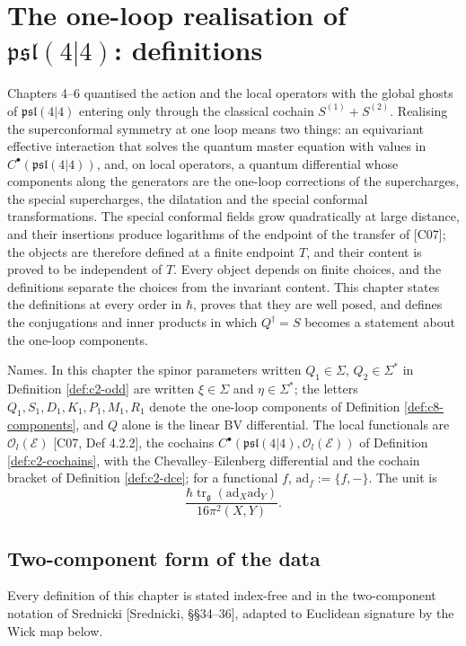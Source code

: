 \chapter{The one-loop realisation of $\mathfrak{psl}(4|4)$: definitions}

Chapters 4--6 quantised the action and the local operators with the global ghosts of $\mathfrak{psl}(4|4)$ entering only through the classical cochain $S^{(1)}+S^{(2)}$. Realising the superconformal symmetry at one loop means two things: an equivariant effective interaction that solves the quantum master equation with values in $C^\bullet(\mathfrak{psl}(4|4))$, and, on local operators, a quantum differential whose components along the generators are the one-loop corrections of the supercharges, the special supercharges, the dilatation and the special conformal transformations. The special conformal fields grow quadratically at large distance, and their insertions produce logarithms of the endpoint of the transfer of [C07]; the objects are therefore defined at a finite endpoint $T$, and their content is proved to be independent of $T$. Every object depends on finite choices, and the definitions separate the choices from the invariant content. This chapter states the definitions at every order in $\hbar$, proves that they are well posed, and defines the conjugations and inner products in which $Q^\dagger=S$ becomes a statement about the one-loop components.

Names. In this chapter the spinor parameters written $Q_1\in\Sigma$, $Q_2\in\Sigma^*$ in Definition \ref{def:c2-odd} are written $\xi\in\Sigma$ and $\eta\in\Sigma^*$; the letters $Q_1,S_1,D_1,K_1,P_1,M_1,R_1$ denote the one-loop components of Definition \ref{def:c8-components}, and $Q$ alone is the linear BV differential. The local functionals are $\mathscr O_l(\mathscr E)$ [C07, Def 4.2.2], the cochains $C^\bullet(\mathfrak{psl}(4|4),\mathscr O_l(\mathscr E))$ of Definition \ref{def:c2-cochains}, with the Chevalley--Eilenberg differential and the cochain bracket of Definition \ref{def:c2-dce}; for a functional $f$, $\mathrm{ad}_f:=\{f,-\}$. The unit is
\[
\frac{\hbar\operatorname{tr}_{\mathfrak g}(\mathrm{ad}_X\mathrm{ad}_Y)}{16\pi^2(X,Y)} .
\]

\section{Two-component form of the data}

Every definition of this chapter is stated index-free and in the two-component notation of Srednicki [Srednicki, §§34--36], adapted to Euclidean signature by the Wick map below.

